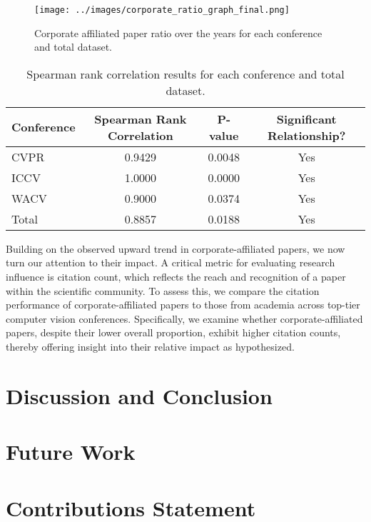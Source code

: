 \documentclass{article}
\begin{document}
\begin{figure}[ht]
  \centering
  \texttt{[image: ../images/corporate\_ratio\_graph\_final.png]}  
  \caption{Corporate affiliated paper ratio over the years for each conference and total dataset.}
  \label{fig:corporate_ratio_graph}
\end{figure}

\begin{table}[ht]
\centering
\begin{tabular}{|l|c|c|c|}
\hline
\textbf{Conference} & \textbf{Spearman Rank Correlation} & \textbf{P-value} & \textbf{Significant Relationship?} \\ \hline
CVPR & 0.9429 & 0.0048 & Yes \\ \hline
ICCV & 1.0000 & 0.0000 & Yes \\ \hline
WACV & 0.9000 & 0.0374 & Yes \\ \hline
Total & 0.8857 & 0.0188 & Yes \\ \hline
\end{tabular}
\caption{Spearman rank correlation results for each conference and total dataset.}
\label{tab:spearman_results}
\end{table}

Building on the observed upward trend in corporate-affiliated papers, we now turn our attention to their impact. A critical metric for evaluating research influence is citation count, which reflects the reach and recognition of a paper within the scientific community. To assess this, we compare the citation performance of corporate-affiliated papers to those from academia across top-tier computer vision conferences. Specifically, we examine whether corporate-affiliated papers, despite their lower overall proportion, exhibit higher citation counts, thereby offering insight into their relative impact as hypothesized.


\section{Discussion and Conclusion}

\section{Future Work}

\section{Contributions Statement}
\end{document}
